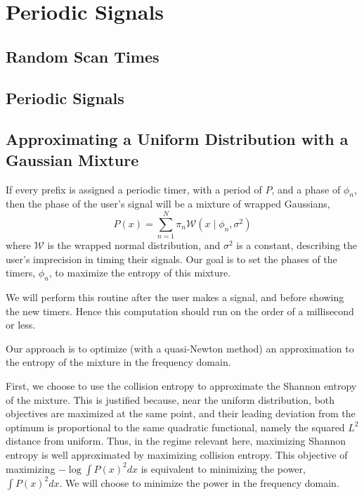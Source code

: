 \section{Periodic Signals}
\subsection{Random Scan Times}
\subsection{Periodic Signals}
\subsection{Approximating a Uniform Distribution with a Gaussian Mixture}

If every prefix is assigned a periodic timer, with
a period of $P$, and a phase of $\phi_n$, then the phase
of the user's signal will be a mixture of wrapped Gaussians,
$$
P(x) = \sum_{n=1}^N \pi_n \mathcal{W}(x \mid \phi_n, \sigma^2)
$$
where $\mathcal{W}$ is the wrapped normal distribution,
and $\sigma^2$ is a constant, describing the user's
imprecision in timing their signals.
Our goal is to set the phases of the timers, $\phi_n$,
to maximize the entropy of this mixture.

We will perform this routine after the user makes a signal,
and before showing the new timers. Hence this computation
should run on the order of a millisecond or less.

Our approach is to optimize (with a quasi-Newton method)
an approximation to the entropy of the mixture
in the frequency domain.

First, we choose to use the collision entropy to
approximate the Shannon entropy of the mixture.
This is justified because, near the uniform distribution,
both objectives are maximized at the same point, and
their leading deviation from the optimum is proportional
to the same quadratic functional, namely the squared
$L^2$ distance from uniform. Thus, in the regime relevant
here, maximizing Shannon entropy is well
approximated by maximizing collision entropy.
This objective of maximizing $-\log \int P(x)^2 dx$
is equivalent to minimizing the power, $\int P(x)^2 dx$.
We will choose to minimize the power in the frequency domain.


